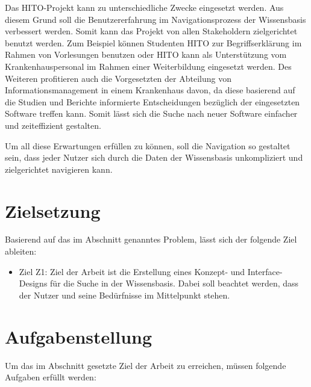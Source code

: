 Das HITO-Projekt kann zu unterschiedliche Zwecke eingesetzt werden. Aus diesem Grund soll die Benutzererfahrung im Navigationsprozess der Wissensbasis verbessert werden. Somit kann das Projekt von allen Stakeholdern zielgerichtet benutzt werden. Zum Beispiel können Studenten HITO zur Begriffserklärung im Rahmen von Vorlesungen benutzen oder HITO kann als Unterstützung vom Krankenhauspersonal im Rahmen einer Weiterbildung eingesetzt werden. Des Weiteren profitieren auch die Vorgesetzten der Abteilung von Informationsmanagement in einem Krankenhaus davon, da diese basierend auf die Studien und Berichte informierte Entscheidungen bezüglich der eingesetzten Software treffen kann. Somit lässt sich die Suche nach neuer Software einfacher und zeiteffizient gestalten.

Um all diese Erwartungen erfüllen zu können, soll die Navigation so gestaltet sein, dass jeder Nutzer sich durch die Daten der Wissensbasis unkompliziert und zielgerichtet navigieren kann.

\section{Zielsetzung}\label{sec:zielsetzung}

Basierend auf das im Abschnitt  genanntes Problem, lässt sich der folgende Ziel ableiten:

\begin{itemize}
\item Ziel Z1: Ziel der Arbeit ist die Erstellung eines Konzept- und Interface-Designs für die Suche in der Wissensbasis. 
Dabei soll beachtet werden, dass der Nutzer und seine Bedürfnisse im Mittelpunkt stehen.
\end{itemize}

\section{Aufgabenstellung}\label{sec:aufgabenstellung}

Um das im Abschnitt  gesetzte Ziel der Arbeit zu erreichen, müssen folgende Aufgaben erfüllt werden:


